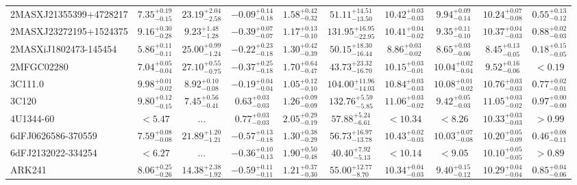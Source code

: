 \documentclass[onecolumn]{mn2e}
\begin{document}
\begin{landscape}
{\begin{center}
\begin{longtable}{lccccccccc}
2MASXJ21355399+4728217 & $7.35_{-0.15}^{+0.19}$ & $23.19_{-2.58}^{+2.04}$ & $-0.09_{-0.18}^{+0.14}$ & $1.58_{-0.32}^{+0.42}$ &$51.11_{-13.50}^{+14.51}$ & $10.42_{-0.03}^{+0.03}$ & $9.94_{-0.14}^{+0.09}$ & $10.24_{-0.08}^{+0.07}$ & $0.55_{-0.12}^{+0.13}$ \\
2MASXJ23272195+1524375 & $9.16_{-0.28}^{+0.30}$ & $9.23_{-1.28}^{+1.48}$ & $-0.39_{-0.07}^{+0.07}$ & $1.17_{-0.10}^{+0.13}$ &$131.95_{-22.95}^{+16.95}$ & $10.41_{-0.02}^{+0.04}$ & $9.35_{-0.10}^{+0.11}$ & $10.37_{-0.03}^{+0.04}$ & $0.88_{-0.03}^{+0.02}$ \\
2MASXiJ1802473-145454 & $5.86_{-0.11}^{+0.11}$ & $25.00_{-1.24}^{+0.99}$ & $-0.22_{-0.18}^{+0.23}$ & $1.30_{-0.39}^{+0.42}$ &$50.15_{-16.44}^{+18.30}$ & $8.86_{-0.02}^{+0.03}$ & $8.65_{-0.06}^{+0.03}$ & $8.45_{-0.05}^{+0.13}$ & $0.18_{-0.05}^{+0.15}$ \\
2MFGC02280 & $7.04_{-0.04}^{+0.05}$ & $27.10_{-0.75}^{+0.55}$ & $-0.37_{-0.18}^{+0.25}$ & $1.70_{-0.47}^{+0.64}$ &$43.73_{-16.70}^{+23.32}$ & $10.15_{-0.01}^{+0.03}$ & $10.04_{-0.04}^{+0.02}$ & $9.52_{-0.06}^{+0.16}$ & $<0.19$ \\
3C111.0 & $9.98_{-0.02}^{+0.01}$ & $8.92_{-0.08}^{+0.10}$ & $-0.19_{-0.04}^{+0.04}$ & $1.05_{-0.10}^{+0.12}$ &$104.00_{-14.03}^{+11.96}$ & $10.84_{-0.03}^{+0.03}$ & $10.08_{-0.02}^{+0.01}$ & $10.76_{-0.03}^{+0.03}$ & $0.77_{-0.01}^{+0.02}$ \\
3C120 & $9.80_{-0.15}^{+0.12}$ & $7.45_{-0.41}^{+0.56}$ & $0.63_{-0.03}^{+0.03}$ & $1.26_{-0.09}^{+0.09}$ &$132.76_{-5.85}^{+5.59}$ & $11.06_{-0.02}^{+0.03}$ & $9.42_{-0.03}^{+0.05}$ & $11.05_{-0.02}^{+0.03}$ & $0.97_{-0.00}^{+0.00}$ \\
4U1344-60 & $<5.47$ & ... & $0.77_{-0.03}^{+0.03}$ & $2.05_{-0.19}^{+0.29}$ &$57.88_{-6.61}^{+5.24}$ & $<10.34$ & $<8.26$ & $10.33_{-0.03}^{+0.03}$ & $>0.99$ \\
6dFJ0626586-370559 & $7.59_{-0.08}^{+0.08}$ & $21.89_{-1.21}^{+1.20}$ & $-0.57_{-0.18}^{+0.13}$ & $1.30_{-0.29}^{+0.38}$ &$56.73_{-13.78}^{+16.97}$ & $10.43_{-0.03}^{+0.02}$ & $10.03_{-0.08}^{+0.07}$ & $10.20_{-0.09}^{+0.05}$ & $0.46_{-0.11}^{+0.08}$ \\
6dFJ2132022-334254 & $<6.27$ & ... & $-0.36_{-0.13}^{+0.10}$ & $1.90_{-0.48}^{+0.50}$ &$40.40_{-5.13}^{+7.92}$ & $<10.14$ & $<9.05$ & $10.10_{-0.05}^{+0.05}$ & $>0.89$ \\
ARK241 & $8.06_{-0.26}^{+0.25}$ & $14.38_{-1.92}^{+2.38}$ & $-0.59_{-0.11}^{+0.11}$ & $1.21_{-0.30}^{+0.37}$ &$55.00_{-8.70}^{+12.77}$ & $10.34_{-0.03}^{+0.04}$ & $9.40_{-0.12}^{+0.15}$ & $10.29_{-0.04}^{+0.04}$ & $0.85_{-0.06}^{+0.04}$ \\

\end{longtable}
\end{center}}
\end{landscape}
\end{document}

